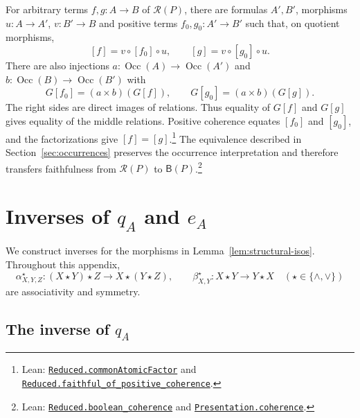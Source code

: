 \documentclass[11pt]{article}
\newcommand{\B}{\mathsf B}
\newcommand{\Occ}{\operatorname{Occ}}
\begin{document}
For arbitrary terms $f,g:A\to B$ of $\mathcal R(P)$, there are
formulas $A',B'$, morphisms
$u:A\to A'$, $v:B'\to B$ and positive terms
$f_0,g_0:A'\to B'$ such that, on quotient morphisms,
\[
 [f]=v\circ[f_0]\circ u,\qquad [g]=v\circ[g_0]\circ u.
\]
There are also injections
$a:\Occ(A)\to\Occ(A')$ and $b:\Occ(B)\to\Occ(B')$ with
\[
 G[f_0]=(a\times b)(G[f]),\qquad
 G[g_0]=(a\times b)(G[g]).
\]
The right sides are direct images of relations. Thus equality
of $G[f]$ and $G[g]$ gives equality of the middle relations.
Positive coherence equates $[f_0]$ and $[g_0]$, and the
factorizations give $[f]=[g]$.\footnote{\raggedright Lean:
\href{https://github.com/flengyel/Dosen-Petric-Maximality/blob/5dbee39bea09539bd130f729e82636419f71f920/DosenPetric/CommonAtomicFactorization.lean\#L51}{\texttt{Reduced.\allowbreak{}commonAtomicFactor}} and
\href{https://github.com/flengyel/Dosen-Petric-Maximality/blob/5dbee39bea09539bd130f729e82636419f71f920/DosenPetric/CommonAtomicFactorization.lean\#L123}{\texttt{Reduced.\allowbreak{}faithful\_of\_positive\_coherence}}.}
The equivalence described in Section~\ref{sec:occurrences}
preserves the occurrence interpretation and therefore transfers
faithfulness from $\mathcal R(P)$ to $\B(P)$.\footnote{\raggedright Lean:
\href{https://github.com/flengyel/Dosen-Petric-Maximality/blob/5dbee39bea09539bd130f729e82636419f71f920/DosenPetric/ReducedCoherence.lean\#L17}{\texttt{Reduced.\allowbreak{}boolean\_coherence}} and
\href{https://github.com/flengyel/Dosen-Petric-Maximality/blob/5dbee39bea09539bd130f729e82636419f71f920/DosenPetric/PresentationCoherence.lean\#L13}{\texttt{Presentation.\allowbreak{}coherence}}.}

\section{Inverses of \texorpdfstring{$q_A$ and $e_A$}{qA and eA}}
\label{app:explicit-inverses}

We construct inverses for the morphisms in
Lemma~\ref{lem:structural-isos}. Throughout this appendix,
\[
 \alpha^\star_{X,Y,Z}:(X\star Y)\star Z\longrightarrow
          X\star(Y\star Z),\qquad
 \beta^\star_{X,Y}:X\star Y\longrightarrow Y\star X
 \quad(\star\in\{\wedge,\vee\})
\]
are associativity and symmetry.

\subsection{The inverse of \texorpdfstring{$q_A$}{qA}}
\end{document}
